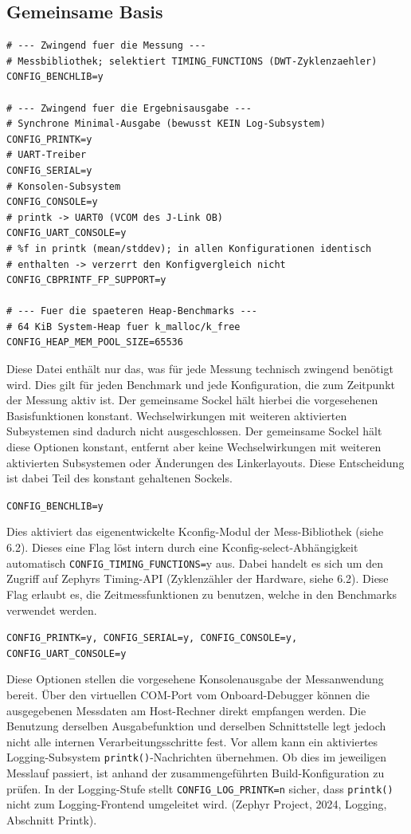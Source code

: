 \subsection{Gemeinsame Basis}
\begin{lstlisting}[style=basecode,language=Kconfig]
# --- Zwingend fuer die Messung ---
# Messbibliothek; selektiert TIMING_FUNCTIONS (DWT-Zyklenzaehler)
CONFIG_BENCHLIB=y

# --- Zwingend fuer die Ergebnisausgabe ---
# Synchrone Minimal-Ausgabe (bewusst KEIN Log-Subsystem)
CONFIG_PRINTK=y
# UART-Treiber
CONFIG_SERIAL=y
# Konsolen-Subsystem
CONFIG_CONSOLE=y
# printk -> UART0 (VCOM des J-Link OB)
CONFIG_UART_CONSOLE=y
# %f in printk (mean/stddev); in allen Konfigurationen identisch
# enthalten -> verzerrt den Konfigvergleich nicht
CONFIG_CBPRINTF_FP_SUPPORT=y

# --- Fuer die spaeteren Heap-Benchmarks ---
# 64 KiB System-Heap fuer k_malloc/k_free
CONFIG_HEAP_MEM_POOL_SIZE=65536
\end{lstlisting}
Diese Datei enth{\"a}lt nur das, was f{\"u}r jede Messung technisch zwingend ben{\"o}tigt wird. Dies gilt f{\"u}r jeden Benchmark und jede Konfiguration, die zum Zeitpunkt der Messung aktiv ist. Der gemeinsame Sockel h{\"a}lt hierbei die vorgesehenen Basisfunktionen konstant. Wechselwirkungen mit weiteren aktivierten Subsystemen sind dadurch nicht ausgeschlossen. Der gemeinsame Sockel h{\"a}lt diese Optionen konstant, entfernt aber keine Wechselwirkungen mit weiteren aktivierten Subsystemen oder {\"A}nderungen des Linkerlayouts. Diese Entscheidung ist dabei Teil des konstant gehaltenen Sockels.

\lstinline[style=fileinline]|CONFIG_BENCHLIB=y|

Dies aktiviert das eigenentwickelte Kconfig-Modul der Mess-Bibliothek (siehe 6.2). Dieses eine Flag l{\"o}st intern durch eine Kconfig-select-Abh{\"a}ngigkeit automatisch \lstinline[style=fileinline]|CONFIG_TIMING_FUNCTIONS=|y aus. Dabei handelt es sich um den Zugriff auf Zephyrs Timing-API (Zyklenz{\"a}hler der Hardware, siehe 6.2). Diese Flag erlaubt es, die Zeitmessfunktionen zu benutzen, welche in den Benchmarks verwendet werden.

\lstinline[style=fileinline]|CONFIG_PRINTK=y, CONFIG_SERIAL=y, CONFIG_CONSOLE=y, CONFIG_UART_CONSOLE=y|

Diese Optionen stellen die vorgesehene Konsolenausgabe der Messanwendung bereit. {\"U}ber den virtuellen COM-Port vom Onboard-Debugger k{\"o}nnen die ausgegebenen Messdaten am Host-Rechner direkt empfangen werden. Die Benutzung derselben Ausgabefunktion und derselben Schnittstelle legt jedoch nicht alle internen Verarbeitungsschritte fest. Vor allem kann ein aktiviertes Logging-Subsystem \lstinline[style=fileinline]|printk()|-Nachrichten {\"u}bernehmen. Ob dies im jeweiligen Messlauf passiert, ist anhand der zusammengef{\"u}hrten Build-Konfiguration zu pr{\"u}fen. In der Logging-Stufe stellt \lstinline[style=fileinline]|CONFIG_LOG_PRINTK=n| sicher, dass \lstinline[style=fileinline]|printk()| nicht zum Logging-Frontend umgeleitet wird. (Zephyr Project, 2024, \glqq{}Logging\grqq{}, Abschnitt \glqq{}Printk\grqq{}).

